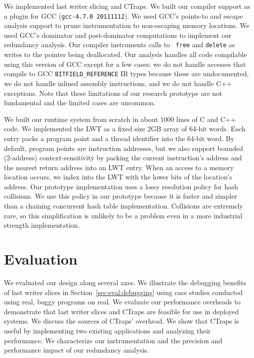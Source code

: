 \documentclass[preprint,9pt]{sigplanconf}
\newcommand{\ctraps}{CTraps\xspace}
\begin{document}
We implemented last writer slicing and \ctraps.  We built our compiler support
as a plugin for GCC ({\tt gcc-4.7.0 20111112}).  We used GCC's points-to and
escape analysis support to prune instrumentation to non-escaping memory
locations.  We used GCC's dominator and post-dominator computations to
implement our redundancy analysis.  Our compiler instruments calls to {\tt
free} and {\tt delete} as writes to the pointer being deallocated.  Our
analysis handles all code compilable using this version of GCC except for a few
cases: we do not handle accesses that compile to GCC {\tt BITFIELD\_REFERENCE}
IR types because these are undocumented, we do not handle inlined assembly
instructions, and we do not handle C++ exceptions.  Note that these limitations
of our research prototype are not fundamental and the limited cases are
uncommon.   

We built our runtime system from scratch in about 1000 lines of C and C++ code.
We implemented the LWT as a fixed size 2GB array of 64-bit words.  Each entry
packs a program point and a thread identifier into the 64-bit word.  By
default, program points are instruction addresses, but we also support bounded
(2-address) context-sensitivity by packing the current instruction's address
and the nearest return address into an LWT entry. When an access to a memory
location occurs, we index into the LWT with the lower bits of the location's
address.  Our prototype implementation uses a lossy resolution policy for hash
collisions.  We use this policy in our prototype because it is faster and
simpler than a chaining concurrent hash table implementation.  Collisions are
extremely rare, so this simplification is unlikely to be a problem even in a
more industrial strength implementation.  

\section{Evaluation}
\label{sec:eval}
We evaluated our design along several axes.  We illustrate the debugging
benefits of last writer slices in Section~\ref{sec:eval:debugging} using case
studies conducted using real, buggy programs on real.   We evaluate our
performance overheads to demonstrate that last writer slices and \ctraps are
feasible for use in deployed systems.  We discuss the sources of \ctraps'
overhead.   We show that \ctraps is useful by implementing two existing
applications and analyzing their performance.  We characterize our
instrumentation and the precision and performance impact of our redundancy
analysis.  
\end{document}
